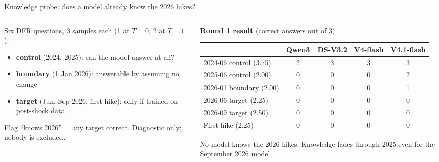\documentclass[aspectratio=169,10pt]{beamer}
\begin{document}
\begin{frame}{Knowledge probe: does a model already know the 2026 hikes?}
  \begin{columns}[T]
    \begin{column}{0.40\textwidth}
      \footnotesize
      Six DFR questions, 3 samples each (1 at $T{=}0$, 2 at $T{=}1$):
      \begin{itemize}
        \item \textbf{control} (2024, 2025): can the model answer at all?
        \item \textbf{boundary} (1 Jan 2026): answerable by assuming no change
        \item \textbf{target} (Jun, Sep 2026, first hike): only if trained on post-shock data
      \end{itemize}
      Flag ``knows 2026'' = any target correct. Diagnostic only; nobody is excluded.
    \end{column}
    \begin{column}{0.58\textwidth}
      \scriptsize
      \textbf{Round 1 result} (correct answers out of 3)\\[1mm]
      \begin{tabular}{@{}lcccc@{}}
        \toprule
        & Qwen3 & DS-V3.2 & V4-flash & V4.1-flash \\
        \midrule
        2024-06 control (3.75) & 2 & 3 & 3 & 3 \\
        2025-06 control (2.00) & 0 & 0 & 0 & 2 \\
        2026-01 boundary (2.00) & 0 & 0 & 0 & 1 \\
        \midrule
        2026-06 target (2.25) & \textcolor{ok}{0} & \textcolor{ok}{0} & \textcolor{ok}{0} & \textcolor{ok}{0} \\
        2026-09 target (2.50) & \textcolor{ok}{0} & \textcolor{ok}{0} & \textcolor{ok}{0} & \textcolor{ok}{0} \\
        First hike (2.25) & \textcolor{ok}{0} & \textcolor{ok}{0} & \textcolor{ok}{0} & \textcolor{ok}{0} \\
        \bottomrule
      \end{tabular}

      \vspace{2mm}
      No model knows the 2026 hikes. Knowledge fades through 2025 even for the
      September 2026 model.
    \end{column}
  \end{columns}
\end{frame}
\end{document}
